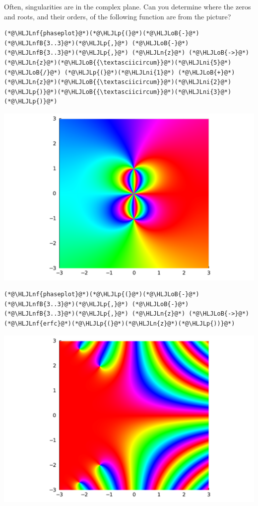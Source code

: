 \documentclass[12pt,a4paper]{article}
\newcommand{\HLJLn}[1]{#1}
\newcommand{\HLJLnf}[1]{\textcolor[RGB]{66,102,213}{#1}}
\newcommand{\HLJLnfB}[1]{\textcolor[RGB]{59,151,46}{#1}}
\newcommand{\HLJLni}[1]{\textcolor[RGB]{59,151,46}{#1}}
\newcommand{\HLJLoB}[1]{\textcolor[RGB]{102,102,102}{\textbf{#1}}}
\newcommand{\HLJLp}[1]{#1}
\begin{document}
Often, singularities are in the complex plane. Can you determine where the zeros and roots, and their orders, of the following function are from the picture?


\begin{lstlisting}
(*@\HLJLnf{phaseplot}@*)(*@\HLJLp{(}@*)(*@\HLJLoB{-}@*)(*@\HLJLnfB{3..3}@*)(*@\HLJLp{,}@*) (*@\HLJLoB{-}@*)(*@\HLJLnfB{3..3}@*)(*@\HLJLp{,}@*) (*@\HLJLn{z}@*) (*@\HLJLoB{->}@*) (*@\HLJLn{z}@*)(*@\HLJLoB{{\textasciicircum}}@*)(*@\HLJLni{5}@*)  (*@\HLJLoB{/}@*) (*@\HLJLp{(}@*)(*@\HLJLni{1}@*) (*@\HLJLoB{+}@*) (*@\HLJLn{z}@*)(*@\HLJLoB{{\textasciicircum}}@*)(*@\HLJLni{2}@*)(*@\HLJLp{)}@*)(*@\HLJLoB{{\textasciicircum}}@*)(*@\HLJLni{3}@*)(*@\HLJLp{)}@*)
\end{lstlisting}

\includegraphics[width=\linewidth]{figures/Lecture1_13_1.pdf}

\begin{lstlisting}
(*@\HLJLnf{phaseplot}@*)(*@\HLJLp{(}@*)(*@\HLJLoB{-}@*)(*@\HLJLnfB{3..3}@*)(*@\HLJLp{,}@*) (*@\HLJLoB{-}@*)(*@\HLJLnfB{3..3}@*)(*@\HLJLp{,}@*) (*@\HLJLn{z}@*) (*@\HLJLoB{->}@*) (*@\HLJLnf{erfc}@*)(*@\HLJLp{(}@*)(*@\HLJLn{z}@*)(*@\HLJLp{))}@*)
\end{lstlisting}

\includegraphics[width=\linewidth]{figures/Lecture1_14_1.pdf}
\end{document}
